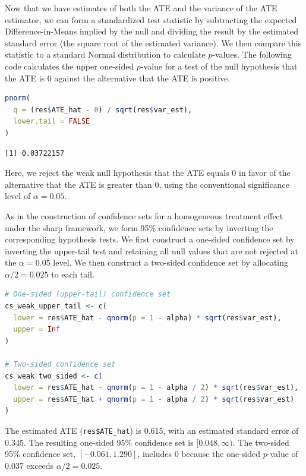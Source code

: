 \documentclass[twoside,11pt]{article}
\begin{document}
Now that we have estimates of both the ATE and the variance of the ATE
estimator, we can form a standardized test statistic by subtracting the
expected Difference-in-Means implied by the null and dividing the result
by the estimated standard error (the square root of the estimated
variance). We then compare this statistic to a standard Normal
distribution to calculate \(p\)-values. The following code calculates the
upper one-sided \(p\)-value for a test of the null hypothesis that the
ATE is \(0\) against the alternative that the ATE is positive.



\begin{lstlisting}[language=R]
pnorm(
  q = (res$ATE_hat - 0) / sqrt(res$var_est),
  lower.tail = FALSE
)
\end{lstlisting}

\begin{verbatim}
[1] 0.03722157
\end{verbatim}



Here, we reject the weak null hypothesis that the ATE equals \(0\) in
favor of the alternative that the ATE is greater than \(0\), using the
conventional significance level of \(\alpha = 0.05\).

As in the construction of confidence sets for a homogeneous treatment
effect under the sharp framework, we form 95\% confidence sets by
inverting the corresponding hypothesis tests. We first construct a
one-sided confidence set by inverting the upper-tail test and
retaining all null values that are not rejected at the \(\alpha = 0.05\)
level. We then construct a two-sided confidence set by allocating
\(\alpha/2 = 0.025\) to each tail.



\begin{lstlisting}[language=R]
# One-sided (upper-tail) confidence set
cs_weak_upper_tail <- c(
  lower = res$ATE_hat - qnorm(p = 1 - alpha) * sqrt(res$var_est),
  upper = Inf
)

# Two-sided confidence set
cs_weak_two_sided <- c(
  lower = res$ATE_hat - qnorm(p = 1 - alpha / 2) * sqrt(res$var_est),
  upper = res$ATE_hat + qnorm(p = 1 - alpha / 2) * sqrt(res$var_est)
)
\end{lstlisting}

The estimated ATE (\texttt{res\$ATE\_hat}) is 0.615, with an estimated
standard error of 0.345. The resulting one-sided 95\% confidence set is
\([0.048, \infty)\). The two-sided 95\% confidence set,
\([-0.061, 1.290]\), includes \(0\) because the one-sided \(p\)-value of
0.037 exceeds \(\alpha/2 = 0.025\).
\end{document}
